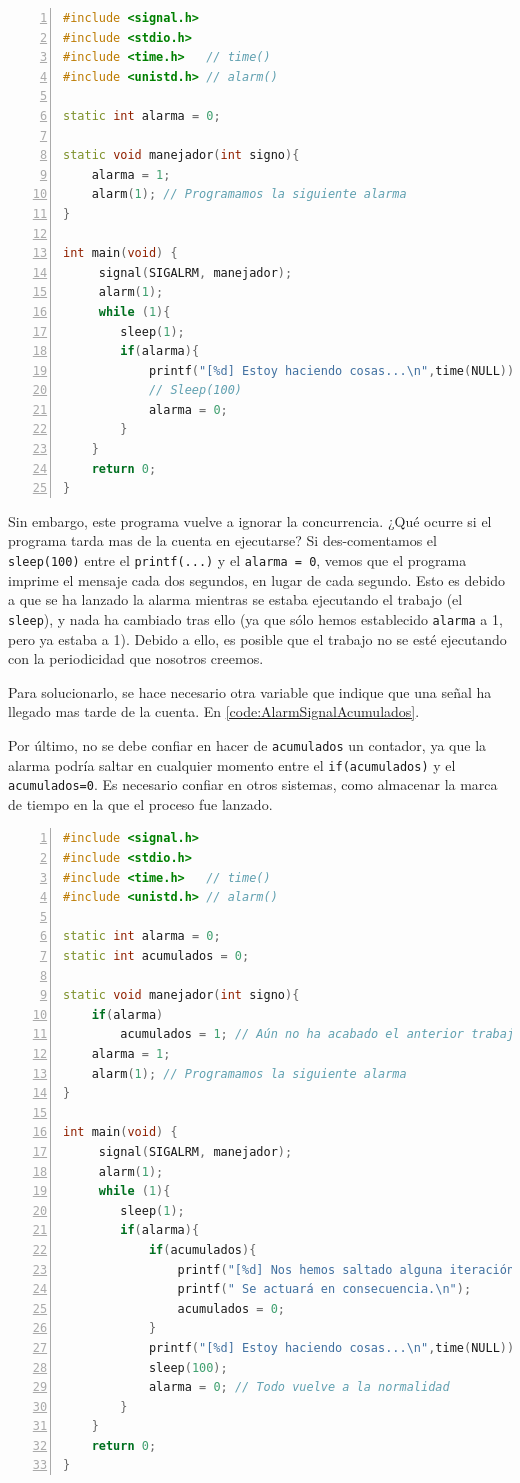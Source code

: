 \begin{lstlisting}[language=C++,caption={Ejemplo de uso de \gls{SIGALRM}}, 
breaklines=true, label=code:AlarmSignal,numbers=left,float=htbp]
#include <signal.h>
#include <stdio.h>
#include <time.h>   // time()
#include <unistd.h> // alarm()

static int alarma = 0;

static void manejador(int signo){
    alarma = 1;
    alarm(1); // Programamos la siguiente alarma
}

int main(void) {
     signal(SIGALRM, manejador);
     alarm(1);
     while (1){
        sleep(1);
        if(alarma){
            printf("[%d] Estoy haciendo cosas...\n",time(NULL));
            // Sleep(100)
            alarma = 0;
        }
    }
    return 0;
}
\end{lstlisting}

Sin embargo, este programa vuelve a ignorar la concurrencia. ¿Qué ocurre si el programa tarda mas de la cuenta en 
ejecutarse? Si des-comentamos el \texttt{sleep(100)} entre el \texttt{printf(...)} y el \texttt{alarma = 0}, vemos que 
el programa imprime el mensaje cada dos segundos, en lugar de cada segundo. Esto es debido a que se ha lanzado la 
alarma mientras se estaba ejecutando el trabajo (el \texttt{sleep}), y nada ha cambiado tras ello (ya que sólo hemos 
establecido \texttt{alarma} a 1, pero ya estaba a 1). Debido a ello, es posible que el trabajo no se esté ejecutando 
con la periodicidad que nosotros creemos.

Para solucionarlo, se hace necesario otra variable que indique que una señal ha llegado mas tarde de la cuenta. En 
\lstlistingname{} \ref{code:AlarmSignalAcumulados}. 

Por último, no se debe confiar en hacer de \texttt{acumulados} un contador, ya que la alarma podría saltar en cualquier 
momento entre el \texttt{if(acumulados)} y el \texttt{acumulados=0}. Es necesario confiar en otros sistemas, como 
almacenar la marca de tiempo en la que el proceso fue lanzado.

\begin{lstlisting}[language=C++,caption={Ejemplo de uso de \gls{SIGALRM} con detección de pérdidas}, breaklines=true, 
label=code:AlarmSignalAcumulados,numbers=left,float=htbp]
#include <signal.h>
#include <stdio.h>
#include <time.h>   // time()
#include <unistd.h> // alarm()

static int alarma = 0;
static int acumulados = 0;

static void manejador(int signo){
    if(alarma)
        acumulados = 1; // Aún no ha acabado el anterior trabajo
    alarma = 1;
    alarm(1); // Programamos la siguiente alarma
}

int main(void) {
     signal(SIGALRM, manejador);
     alarm(1);
     while (1){
        sleep(1);
        if(alarma){
            if(acumulados){
                printf("[%d] Nos hemos saltado alguna iteración.",time(NULL));
                printf(" Se actuará en consecuencia.\n");
                acumulados = 0;
            }
            printf("[%d] Estoy haciendo cosas...\n",time(NULL));
            sleep(100);
            alarma = 0; // Todo vuelve a la normalidad
        }
    }
    return 0;
}
\end{lstlisting}

